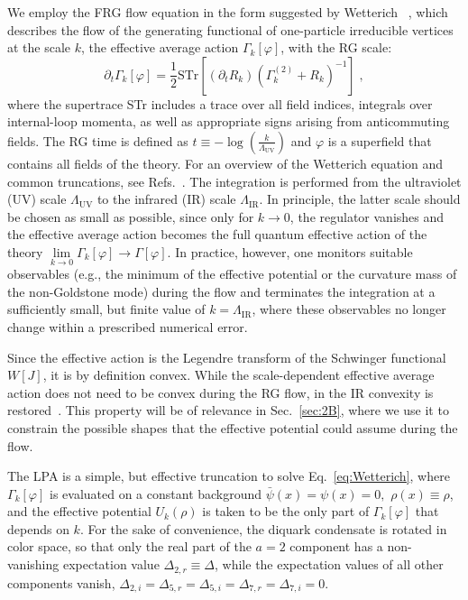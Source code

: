 \documentclass[
onecolumn,
aps,
prd,
amsmath,
amssymb,
nofootinbib
]{revtex4-2}
\begin{document}
We employ the FRG flow equation in the form suggested by Wetterich ~\cite{wetterich1993exact}, which describes the flow of the generating functional of one-particle irreducible vertices at the scale $k$, the effective average action $\Gamma_k[\varphi]$, with the RG scale:
\begin{equation}\label{eq:Wetterich}
	\partial_t \Gamma_k[\varphi] = \frac{1}{2}\mathrm{STr}\left[\left(\partial_t R_k\right)\left(\Gamma_k^{(2)} + R_k\right)^{-1}\right]\;,
\end{equation}
where the supertrace STr includes a trace over all field indices, integrals over internal-loop momenta, as well as appropriate signs arising from anticommuting fields.
The RG time is defined as $t\equiv -\log(\frac{k}{\Lambda_{\text{UV}}})$ and $\varphi$ is a superfield that contains all fields of the theory. 
For an overview of the Wetterich equation and common truncations, see Refs.~\cite{Dupuis:2020fhh,morris1994truncations,Pawlowski:2005xe}. 
The integration is performed from the ultraviolet (UV) scale $\Lambda_{\text{UV}}$ to the infrared (IR) scale $\Lambda_{\mathrm{IR}}$.
In principle, the latter scale should be chosen as small as possible, since only for $k \to 0$, the regulator vanishes and the effective average action becomes the full quantum effective action of the theory $\lim\limits_ {k\to0}\Gamma_k[\varphi]\to \Gamma[\varphi]$.
In practice, however, one monitors suitable observables (e.g., the minimum of the effective potential or the curvature mass of the non-Goldstone mode)  during the flow and terminates the integration at a sufficiently small, but finite value of $k=\Lambda_{\mathrm{IR}}$, where these observables no longer change within a prescribed numerical error.



Since the effective action is the Legendre transform of the Schwinger functional $W[J]$, it is by definition convex. 
While the scale-dependent effective average action does not need to be convex during the RG flow, in the IR  convexity is restored~\cite{litim2006convexity}.
This property will be of relevance in Sec.~\ref{sec:2B}, where we use it to constrain the possible shapes that the effective potential could assume during the flow.
 
The LPA is a simple, but effective truncation to solve Eq.~\eqref{eq:Wetterich}, where $\Gamma_k[\varphi]$ is evaluated on a constant background $\bar{ \psi}(x) = \psi(x) = 0,\,\, \rho(x)  \equiv \rho$, and the effective potential $U_k(\rho)$ is taken to be the only part of $\Gamma_k[\varphi]$ that depends on $k$. 
For the sake of convenience, the diquark condensate is rotated in color space, so that only the real part of the $a=2$ component has a non-vanishing expectation value $\Delta_{2,r} \equiv \Delta$, while the expectation values of all other components vanish, $\Delta_{2,i} = \Delta_{5,r} = \Delta_{5,i} = \Delta_{7,r} = \Delta_{7,i} =0$.
\end{document}
